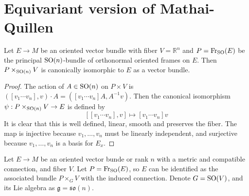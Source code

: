 \section{Equivariant version of Mathai-Quillen}
\begin{prop}
	Let $E\to M$ be an oriented vector bundle with fiber $V=\mathbb{R}^n$ 
	and  $P=\operatorname{Fr}_{\operatorname{SO}}(E)$ be the
	principal $\operatorname{SO}(n)$-bundle of orthonormal oriented frames on  $E$. Then 
	$P\times_{\operatorname{SO}(n)} V$ is canonically isomorphic to $E$ as a vector bundle. 
\end{prop} 
\begin{proof}
	The action of $A\in\operatorname{SO}(n)$ on $P\times V$ is 
	$
		([v_1 \cdots v_n], v) \cdot A = ([v_1 \cdots v_n] A, A^{-1} v) 
	$.
	Then the canonical isomorphism $\psi : P\times_{\operatorname{SO}(n)} V \to E$ is defined by
	\[
		[[v_1 \cdots v_n], v] \mapsto [v_1 \cdots v_n] v
	\] 
	It is clear that this is well defined, linear, smooth and preserves the
	fiber. The map is injective because $v_1,\ldots,v_n$ must be linearly
	independent, and surjective because $v_1,\ldots,v_n$ is a basis for $E_x$.
\end{proof}
Let $E\to M$ be an oriented vector bunde or rank  $n$ with a
metric and compatible connection, and fiber $V$. 
Let $P=\operatorname{Fr}_{\operatorname{SO}}(E)$, so 
$E$ can be identified as the associated bundle $P\times_G V$ with the
induced connection. 
Denote $G=\operatorname{SO}(V)$, and its Lie algebra as $\mathfrak{g}=\mathfrak{so}(n)$.

